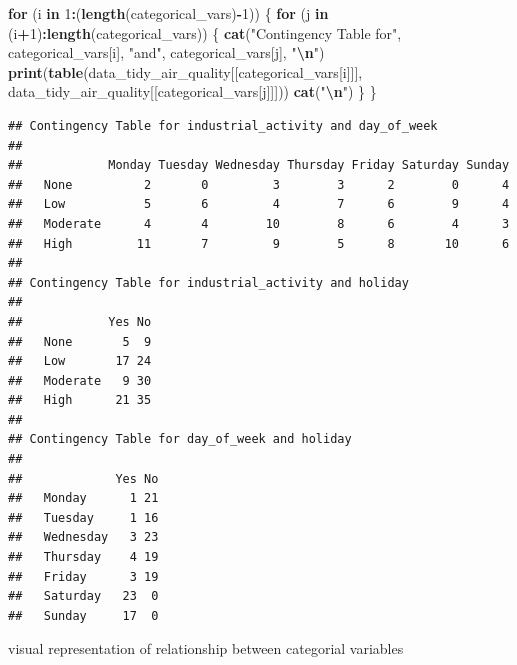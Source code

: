 \documentclass[12pt,halfline,a4paper,]{ouparticle}
\newenvironment{Shaded}{\begin{snugshade}}{\end{snugshade}}
\newcommand{\ControlFlowTok}[1]{\textcolor[rgb]{0.13,0.29,0.53}{\textbf{#1}}}
\newcommand{\DecValTok}[1]{\textcolor[rgb]{0.00,0.00,0.81}{#1}}
\newcommand{\FunctionTok}[1]{\textcolor[rgb]{0.13,0.29,0.53}{\textbf{#1}}}
\newcommand{\NormalTok}[1]{#1}
\newcommand{\SpecialCharTok}[1]{\textcolor[rgb]{0.81,0.36,0.00}{\textbf{#1}}}
\newcommand{\StringTok}[1]{\textcolor[rgb]{0.31,0.60,0.02}{#1}}
\begin{document}
\begin{Shaded}
\begin{Highlighting}[]
\ControlFlowTok{for}\NormalTok{ (i }\ControlFlowTok{in} \DecValTok{1}\SpecialCharTok{:}\NormalTok{(}\FunctionTok{length}\NormalTok{(categorical\_vars)}\SpecialCharTok{{-}}\DecValTok{1}\NormalTok{)) \{}
  \ControlFlowTok{for}\NormalTok{ (j }\ControlFlowTok{in}\NormalTok{ (i}\SpecialCharTok{+}\DecValTok{1}\NormalTok{)}\SpecialCharTok{:}\FunctionTok{length}\NormalTok{(categorical\_vars)) \{}
    \FunctionTok{cat}\NormalTok{(}\StringTok{"Contingency Table for"}\NormalTok{, categorical\_vars[i], }\StringTok{"and"}\NormalTok{, categorical\_vars[j], }\StringTok{"}\SpecialCharTok{\textbackslash{}n}\StringTok{"}\NormalTok{)}
    \FunctionTok{print}\NormalTok{(}\FunctionTok{table}\NormalTok{(data\_tidy\_air\_quality[[categorical\_vars[i]]], data\_tidy\_air\_quality[[categorical\_vars[j]]]))}
    \FunctionTok{cat}\NormalTok{(}\StringTok{"}\SpecialCharTok{\textbackslash{}n}\StringTok{"}\NormalTok{)}
\NormalTok{  \}}
\NormalTok{\}}
\end{Highlighting}
\end{Shaded}

\begin{verbatim}
## Contingency Table for industrial_activity and day_of_week 
##           
##            Monday Tuesday Wednesday Thursday Friday Saturday Sunday
##   None          2       0         3        3      2        0      4
##   Low           5       6         4        7      6        9      4
##   Moderate      4       4        10        8      6        4      3
##   High         11       7         9        5      8       10      6
## 
## Contingency Table for industrial_activity and holiday 
##           
##            Yes No
##   None       5  9
##   Low       17 24
##   Moderate   9 30
##   High      21 35
## 
## Contingency Table for day_of_week and holiday 
##            
##             Yes No
##   Monday      1 21
##   Tuesday     1 16
##   Wednesday   3 23
##   Thursday    4 19
##   Friday      3 19
##   Saturday   23  0
##   Sunday     17  0
\end{verbatim}

visual representation of relationship between categorial variables
\end{document}
